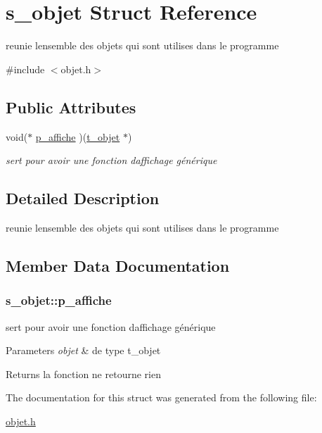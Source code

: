 \hypertarget{structs__objet}{}\section{s\+\_\+objet Struct Reference}
\label{structs__objet}


reunie l\textquotesingle{}ensemble des objets qui sont utilises dans le programme  




{\ttfamily \#include $<$objet.\+h$>$}

\subsection*{Public Attributes}
\begin{DoxyCompactItemize}
\item 
void($\ast$ \hyperlink{structs__objet_ac6619f11433c9e78ceabef66cbe69221}{p\+\_\+affiche} )(\hyperlink{structs__objet}{t\+\_\+objet} $\ast$)
\begin{DoxyCompactList}\small\item\em sert pour avoir une fonction d\textquotesingle{}affichage générique \end{DoxyCompactList}\end{DoxyCompactItemize}


\subsection{Detailed Description}
reunie l\textquotesingle{}ensemble des objets qui sont utilises dans le programme 

\subsection{Member Data Documentation}
\subsubsection[{\texorpdfstring{p\+\_\+affiche}{p_affiche}}]{\setlength{\rightskip}{0pt plus 5cm}s\+\_\+objet\+::p\+\_\+affiche}\hypertarget{structs__objet_ac6619f11433c9e78ceabef66cbe69221}{}\label{structs__objet_ac6619f11433c9e78ceabef66cbe69221}


sert pour avoir une fonction d\textquotesingle{}affichage générique 


\begin{DoxyParams}{Parameters}
{\em objet} & de type t\+\_\+objet \\
\hline
\end{DoxyParams}
\begin{DoxyReturn}{Returns}
la fonction ne retourne rien 
\end{DoxyReturn}


The documentation for this struct was generated from the following file\+:\begin{DoxyCompactItemize}
\item 
\hyperlink{objet_8h}{objet.\+h}\end{DoxyCompactItemize}
